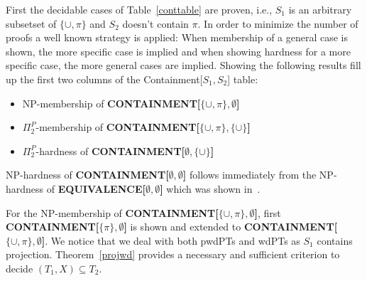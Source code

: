 First the decidable cases of Table~\ref{conttable} are proven, i.e., $S_1$ is an arbitrary subsetset of
$\{\cup,\pi\}$ and $S_2$ doesn't contain $\pi$. 
In order to minimize the number of proofs a well known strategy is applied: When membership of a
general case is shown, the more specific case is implied and when showing
hardness for a more specific case, the more general cases are implied.  
Showing the following results fill up the first two columns of the
Containment[$S_1,S_2$] table:
\begin{itemize}
	\item NP-membership of \textbf{CONTAINMENT[$\{\cup,\pi\},\emptyset$]}
	\item $\Pi^P_2$-membership of \textbf{CONTAINMENT[$\{\cup,\pi\},\{\cup\}$]}
	\item $\Pi^P_2$-hardness of \textbf{CONTAINMENT[$\emptyset,\{\cup\}$]}
\end{itemize}
NP-hardness of \textbf{CONTAINMENT[$\emptyset,\emptyset$]} follows immediately
from the NP-hardness of \textbf{EQUIVALENCE[$\emptyset,\emptyset$]} which was shown
in~\cite{letelier2013static}.

For the NP-membership of \textbf{CONTAINMENT[$\{\cup,\pi \}, \emptyset$]}, 
first \textbf{CONTAINMENT[$\{\pi\} , \emptyset$]} is shown and extended to 
\textbf{CONTAINMENT[$\{\cup,\pi \}, \emptyset$]}. We notice that we deal with
both pwdPTs and wdPTs as $S_1$ contains projection. Theorem~\ref{projwd} provides a
necessary and sufficient criterion to decide $(T_1,X) \subseteq T_2$.

